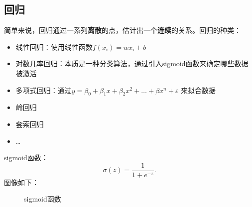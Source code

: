 \subsection{回归}%
\label{sub:回归}
简单来说，回归通过一系列\textbf{离散}的点，估计出一个\textbf{连续}的关系。回归的种类：
\begin{itemize}
    \item 线性回归：使用线性函数$f\left( x_{i} \right)=w x_{i}+b$
    \item 对数几率回归：本质是一种分类算法，通过引入sigmoid函数来确定哪些数据被激活
    \item 多项式回归：通过$y=\beta_0+\beta_1x+\beta_2x^2 +\ldots +\beta x^{n}+\varepsilon$ 来拟合数据
    \item 岭回归
    \item 套索回归
    \item \ldots
\end{itemize}
sigmoid函数：\[
    \sigma\left( z \right) = \frac{1}{1+e^{-z}}
.\]
图像如下：
\begin{figure}[ht!]
    \centering
    \caption{sigmoid函数}
    \label{fig:sigmoid函数}
\end{figure}

